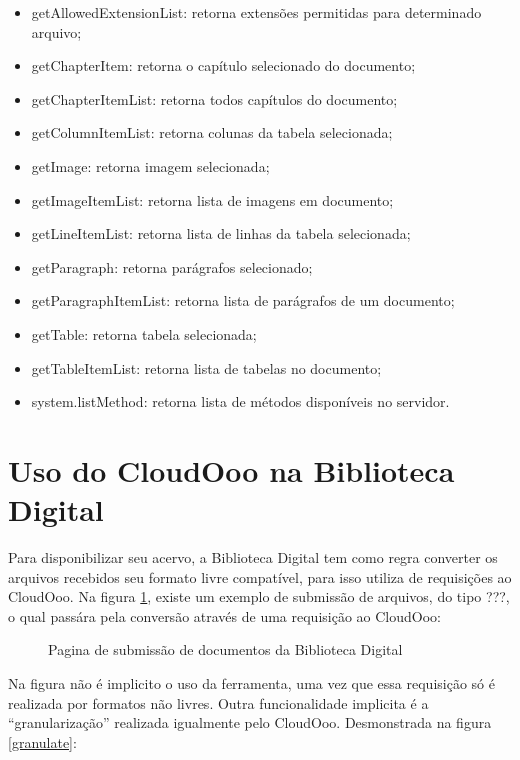 \begin{itemize}
    \item{getAllowedExtensionList: retorna extensões permitidas para determinado arquivo;}
    \item{getChapterItem: retorna o capítulo selecionado do documento;}
    \item{getChapterItemList: retorna todos capítulos do documento;}
    \item{getColumnItemList: retorna colunas da tabela selecionada;}
    \item{getImage: retorna imagem selecionada;}
    \item{getImageItemList: retorna lista de imagens em documento;}
    \item{getLineItemList: retorna lista de linhas da tabela selecionada;}
    \item{getParagraph: retorna parágrafos selecionado;}
    \item{getParagraphItemList: retorna lista de parágrafos de um documento;}
    \item{getTable: retorna tabela selecionada;}
    \item{getTableItemList: retorna lista de tabelas no documento;}
    \item{system.listMethod: retorna lista de métodos disponíveis no servidor.}
\end{itemize}

\section{Uso do CloudOoo na Biblioteca Digital}

Para disponibilizar seu acervo, a Biblioteca Digital tem como regra converter os arquivos recebidos seu formato livre compatível, para isso utiliza de requisições ao CloudOoo. Na figura \ref{submeter-bd}, existe um exemplo de submissão de arquivos, do tipo ???, o qual passára pela conversão através de uma requisição ao CloudOoo:

\begin{figure}[ht]
    \centering
    \caption{Pagina de submissão de documentos da Biblioteca Digital}
    \label{submeter-bd}
\end{figure}

Na figura não é implicito o uso da ferramenta, uma vez que essa requisição só é realizada por formatos não livres. Outra funcionalidade implicita é a ``granularização'' realizada igualmente pelo CloudOoo. Desmonstrada na figura \ref{granulate}:

